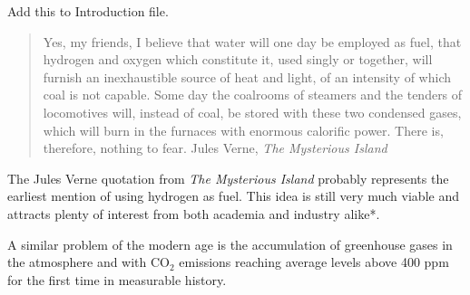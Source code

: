 Add this to Introduction file.

\begin{quotation}
Yes, my friends, I believe that water will one day be employed as fuel,
that hydrogen and oxygen which constitute it, used singly or together, will
furnish an inexhaustible source of heat and light, of an intensity of which
coal is not capable. Some day the coalrooms of steamers and the tenders of
locomotives will, instead of coal, be stored with these two condensed
gases, which will burn in the furnaces with enormous calorific power. There
is, therefore, nothing to fear. 
\raggedleft Jules Verne, \emph{The Mysterious Island}\cite{vernemysterious}
\end{quotation}

The Jules Verne quotation from \emph{The Mysterious Island}  probably  represents the earliest mention of using hydrogen as fuel. This idea is still very much viable and attracts plenty of interest from both academia and industry alike*.

A similar problem of the modern age is the accumulation of greenhouse gases in the atmosphere and with CO$_2$ emissions reaching average levels above 400 ppm for the first time in measurable history.